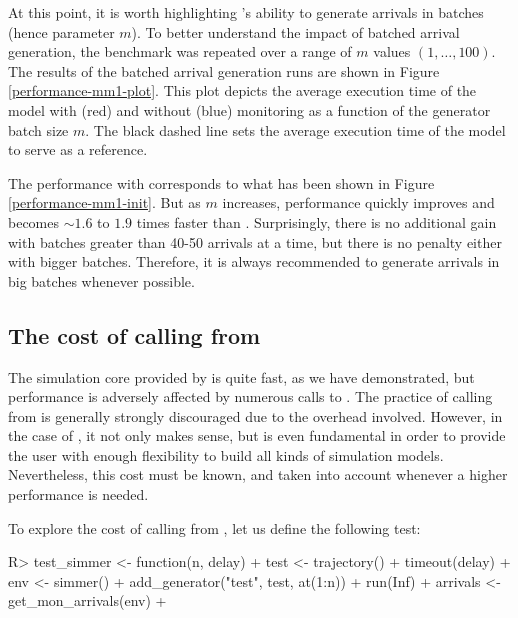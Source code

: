\documentclass[
  nojss]{jss}
\begin{document}
At this point, it is worth highlighting 's ability to
generate arrivals in batches (hence parameter \(m\)). To better
understand the impact of batched arrival generation, the benchmark was
repeated over a range of \(m\) values \((1, \ldots, 100)\). The results
of the batched arrival generation runs are shown in Figure
\ref{performance-mm1-plot}. This plot depicts the average execution time
of the  model with (red) and without (blue) monitoring as a
function of the generator batch size \(m\). The black dashed line sets
the average execution time of the  model to serve as a
reference.

The performance with  corresponds to what has been shown in
Figure \ref{performance-mm1-init}. But as \(m\) increases, 
performance quickly improves and becomes \(\sim1.6\) to \(1.9\) times
faster than . Surprisingly, there is no additional gain with
batches greater than 40-50 arrivals at a time, but there is no penalty
either with bigger batches. Therefore, it is always recommended to
generate arrivals in big batches whenever possible.

\subsection[The cost of calling R from C++]{The cost of calling  from }

The  simulation core provided by  is quite
fast, as we have demonstrated, but performance is adversely affected by
numerous calls to . The practice of calling 
from  is generally strongly discouraged due to the
overhead involved. However, in the case of , it not only
makes sense, but is even fundamental in order to provide the user with
enough flexibility to build all kinds of simulation models.
Nevertheless, this cost must be known, and taken into account whenever a
higher performance is needed.

To explore the cost of calling  from , let us
define the following test:

\begin{CodeChunk}
\begin{CodeInput}
R> test_simmer <- function(n, delay) {
+   test <- trajectory() %
+     timeout(delay)
+   env <- simmer() %
+     add_generator("test", test, at(1:n)) %
+     run(Inf)
+   arrivals <- get_mon_arrivals(env)
+ }
\end{CodeInput}
\end{CodeChunk}
\end{document}
